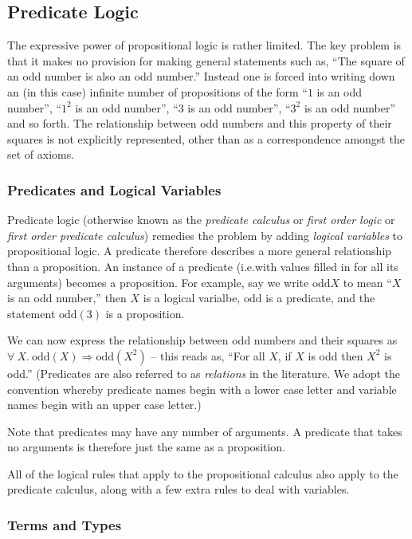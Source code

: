 \documentclass[a4paper,11pt,notitlepage,onecolumn]{article}
\makeatletter
\newcommand{\ie}%
{i.e.\@ }
\newcommand{\Imp}%
{\Rightarrow}
\newcommand{\All}[2]%
{\forall\ #1.\ #2}
\newcommand{\Odd}%
{\text{odd}}
\makeatother
\begin{document}
\subsection{Predicate Logic}

The expressive power of propositional logic is rather limited.  The key
problem is that it makes no provision for making general statements such
as, ``The square of an odd number is also an odd number.''  Instead one
is forced into writing down an (in this case) infinite number of
propositions of the form ``$1$ is an odd number'', ``$1^2$ is an odd
number'', ``$3$ is an odd number'', ``$3^2$ is an odd number'' and so
forth.  The relationship between odd numbers and this property of their
squares is not explicitly represented, other than as a correspondence
amongst the set of axioms.

\subsubsection{Predicates and Logical Variables}

Predicate logic (otherwise known as the \emph{predicate calculus} or
\emph{first order logic} or \emph{first order predicate calculus})
remedies the problem by adding \emph{logical variables} to propositional
logic.  A predicate therefore describes a more general relationship than
a proposition.  An instance of a predicate (\ie with values filled in
for all its arguments) becomes a proposition.  For example, say we write
$\Odd{X}$ to mean ``$X$ is an odd number,'' then $X$ is a logical
varialbe, $\Odd$ is a predicate, and the statement $\Odd(3)$ is a
proposition.

We can now express the relationship between odd numbers and their
squares as
$\All{X}{\Odd(X) \Imp \Odd(X^2)}$ -- this reads as, ``For all $X$, if
$X$ is odd then $X^2$ is odd.''
(Predicates are also referred to as \emph{relations} in the literature.
We adopt the convention whereby predicate names begin with a lower case
letter and variable names begin with an upper case letter.)

Note that predicates may have any number of arguments.  A predicate that
takes no arguments is therefore just the same as a proposition.

All of the logical rules that apply to the propositional calculus also
apply to the predicate calculus, along with a few extra rules to deal
with variables.

\subsubsection{Terms and Types}
\end{document}
